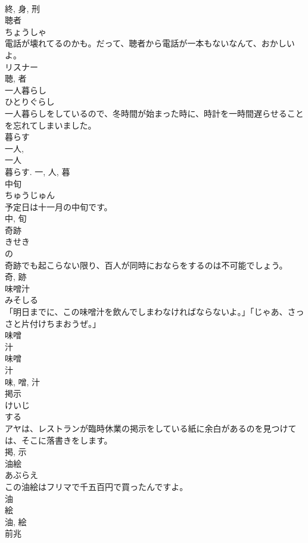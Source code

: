 \documentclass[8pt]{extreport}
\begin{document}
\begin{CJK}{UTF8}{min}
\\	終, 身, 刑	
\\	聴者	
\\	ちょうしゃ	
\\	電話が壊れてるのかも。だって、聴者から電話が一本もないなんて、おかしいよ。	
\\	リスナー 
\\	聴, 者	
\\	一人暮らし	
\\	ひとりぐらし	
\\	一人暮らしをしているので、冬時間が始まった時に、時計を一時間遅らせることを忘れてしまいました。	
\\	暮らす 
\\	一人, 
\\	一人 
\\	暮らす.	一, 人, 暮	
\\	中旬	
\\	ちゅうじゅん	
\\	予定日は十一月の中旬です。	
\\	中, 旬	
\\	奇跡	
\\	きせき	
\\	の 
\\	奇跡でも起こらない限り、百人が同時におならをするのは不可能でしょう。	
\\	奇, 跡	
\\	味噌汁	
\\	みそしる	
\\	「明日までに、この味噌汁を飲んでしまわなければならないよ。」「じゃあ、さっさと片付けちまおうぜ。」	
\\	味噌 
\\	汁 
\\	味噌 
\\	汁 
\\	味, 噌, 汁	
\\	掲示	
\\	けいじ	
\\	する 
\\	アヤは、レストランが臨時休業の掲示をしている紙に余白があるのを見つけては、そこに落書きをします。	
\\	掲, 示	
\\	油絵	
\\	あぶらえ	
\\	この油絵はフリマで千五百円で買ったんですよ。	
\\	油 
\\	絵 
\\	油, 絵	
\\	前兆	

\end{CJK}
\end{document}
